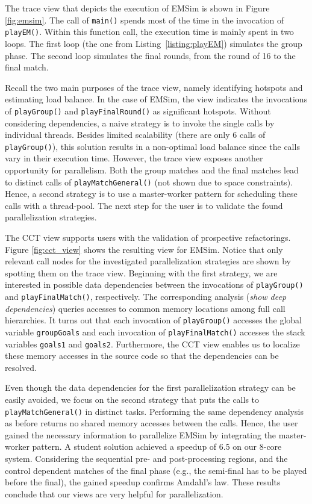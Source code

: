 The trace view that depicts the execution of EMSim is shown in Figure
\ref{fig:emsim}. The call of \texttt{main()} spends most of the time in the
invocation of \texttt{playEM()}. Within this function call, the execution time
is mainly spent in two loops. The first loop (the one from
Listing~\ref{listing:playEM}) simulates the group phase. The second loop
simulates the final rounds, from the round of 16 to the final match.

Recall the two main purposes of the trace view, namely identifying hotspots
and estimating load balance. In the case of EMSim, the view indicates the
invocations of \texttt{playGroup()} and \texttt{playFinalRound()} as
significant hotspots. Without considering dependencies, a naive strategy is to
invoke the single calls by individual threads. Besides limited scalability
(there are only 6 calls of \texttt{playGroup()}), this solution results in a
non-optimal load balance since the calls vary in their execution time. However,
the trace view exposes another opportunity for parallelism. Both the group
matches and the final matches lead to distinct calls of
\texttt{playMatchGeneral()} (not shown due to space constraints). Hence, a
second strategy is to use a master-worker pattern for scheduling these calls
with a thread-pool. The next step for the user is to validate the found
parallelization strategies.

The CCT view supports users with the validation of prospective refactorings. 
Figure \ref{fig:cct_view} shows the resulting view for EMSim. Notice that
only relevant call nodes for the investigated parallelization strategies are
shown by spotting them on the trace view. Beginning with the first strategy, we
are interested in possible data dependencies between the invocations of
\texttt{playGroup()} and \texttt{playFinalMatch()}, respectively. The
corresponding analysis (\textit{show deep dependencies}) queries accesses 
to common memory locations among full call hierarchies. It turns out that each
invocation of \texttt{playGroup()} accesses the global variable
\texttt{groupGoals} and each invocation of \texttt{playFinalMatch()} accesses
the stack variables \texttt{goals1} and \texttt{goals2}. Furthermore, the CCT
view enables us to localize these memory accesses in the source code so that
the dependencies can be resolved.

Even though the data dependencies for the first parallelization strategy
can be easily avoided, we focus on the second strategy that puts the calls to
\texttt{playMatchGeneral()} in distinct tasks. Performing the same dependency
analysis as before returns no shared memory accesses between the calls. Hence,
the user gained the necessary information to parallelize EMSim by integrating
the master-worker pattern. A student solution achieved a speedup of 6.5 on our
8-core system. Considering the sequential pre- and post-processing regions,
and the control dependent matches of the final phase (e.g., the semi-final has 
to be played before the final), the gained speedup confirms Amdahl's law. These
results conclude that our views are very helpful for parallelization.
